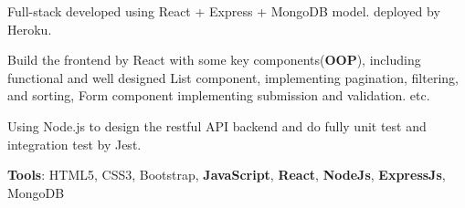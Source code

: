 \documentclass[letterpaper]{deedy-resume} %
\begin{document}
\begin{minipage}[t]{1\textwidth}
\vspace{\topsep} %
\begin{tightitemize}
	\item Full-stack developed using React + Express + MongoDB model.
	deployed by Heroku.
	\item Build the frontend by React with some key components(\textbf{OOP}), including functional and well designed List component, implementing pagination, filtering, and sorting, Form component implementing submission and validation. etc.
	\item Using Node.js to design the restful API backend and do fully unit test and integration test by Jest.
	\item \textbf{Tools}: HTML5, CSS3, Bootstrap, \textbf{JavaScript}, \textbf{React}, \textbf{NodeJs}, \textbf{ExpressJs}, MongoDB
\end{tightitemize}

\end{minipage} %

\end{document}

